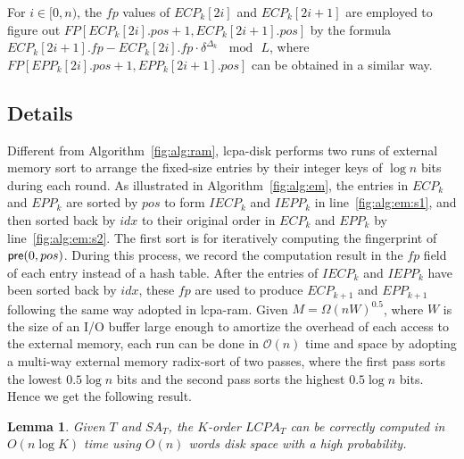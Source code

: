 \documentclass[10pt,journal,letterpaper,compsoc]{IEEEtran}
\newtheorem{Lemma}{Lemma}
\begin{document}
\begin{CJK*}{GBK}{song}
For $i\in [0,n)$, the $fp$ values of $ECP_k[2i]$ and $ECP_k[2i+1]$ are employed to figure out $FP[ECP_k[2i].pos+1, ECP_k[2i+1].pos]$ by the formula $ECP_k[2i+1].fp - ECP_k[2i].fp \cdot \delta^{\Delta_k} \, \mod \, L$, where $FP[EPP_k[2i].pos+1, EPP_k[2i+1].pos]$ can be obtained in a similar way.

\subsection{Details}
Different from Algorithm~\ref{fig:alg:ram}, lcpa-disk performs two runs of external memory sort to arrange the fixed-size entries by their integer keys of $\log n$ bits during each round. As illustrated in Algorithm~\ref{fig:alg:em}, the entries in $ECP_k$ and $EPP_k$ are sorted by $pos$ to form $IECP_k$ and $IEPP_k$ in line~\ref{fig:alg:em:s1}, and then sorted back by $idx$ to their original order in $ECP_k$ and $EPP_k$ by line~\ref{fig:alg:em:s2}. The first sort is for iteratively computing the fingerprint of ${\sf pre}(0,pos)$. During this process, we record the computation result in the $fp$ field of each entry instead of a hash table. After the entries of $IECP_k$ and $IEPP_k$ have been sorted back by $idx$, these $fp$ are used to produce $ECP_{k+1}$ and $EPP_{k+1}$ following the same way adopted in lcpa-ram. Given $M=\Omega(nW)^{0.5}$, where $W$ is the size of an I/O buffer large enough to amortize the overhead of each access to the external memory, each run can be done in $\mathcal{O}(n)$ time and space by adopting a multi-way external memory radix-sort of two passes, where the first pass sorts the lowest $0.5\log n$ bits and the second pass sorts the highest $0.5\log n$ bits. Hence we get the following result.

\begin{Lemma}
\label{thm:lcp:em}
Given $T$ and $SA_T$, the $K$-order $LCPA_T$ can be correctly computed in $O(n \log K)$ time using $O(n)$ words disk space with a high probability.
\end{Lemma}


\end{CJK*}
\end{document}
